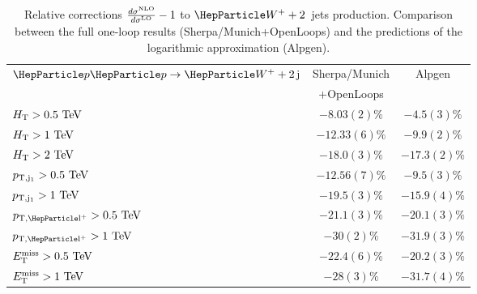 \documentclass[11pt]{cernrep}
\begin{document}
\begin{table}
\centering
\small{
\begin{tabular}{l|c|c}
\hline
$\Pp\Pp\to\PW^++2\,\rm j$ & {\sc Sherpa/Munich}  & {\sc Alpgen}  \\[-1ex]
                          & {\sc +OpenLoops}  &  \\
\hline
\hline
$H_{\rm T}>0.5~\text{TeV}$ & $-8.03(2)\%$  & $-4.5(3)\%$     \\
$H_{\rm T}>1~\text{TeV}$   & $-12.33(6)\%$ & $-9.9(2)\%$       \\
$H_{\rm T}>2~\text{TeV}$   & $-18.0(3)\%$ & $-17.3(2)\%$       \\
\hline
$p_{\rm T,j_1}>0.5~\text{TeV}$  & $-12.56(7)\%$ & $-9.5(3)\%$      \\
$p_{\rm T,j_1}>1~\text{TeV}$    & $-19.5(3)\%$  & $-15.9(4)\%$       \\
\hline
$p_{\rm T,\Pl^+}>0.5\UTeV$  & $-21.1(3)\%$   &  $-20.1(3)\%$   \\
$p_{\rm T,\Pl^+}>1\UTeV$    & $-30(2)\%$     &  $-31.9(3)\%$     \\
\hline
$E_{\rm T}^{\rm miss}>0.5~\text{TeV}$  & $-22.4(6)\%$  &  $-20.2(3)\%$    \\
$E_{\rm T}^{\rm miss}>1~\text{TeV}$    & $-28(3)\%$    &  $-31.7(4)\%$    \\
\hline
\end{tabular}
}
\caption{ \label{tabelwpj} Relative corrections $\frac{d \sigma^{\rm NLO}}{d \sigma^{\rm LO}}-1$ to 
$\PW^++2$~jets production. Comparison between the full one-loop results ({\sc Sherpa/Munich+OpenLoops}) and the 
predictions of the logarithmic approximation ({\sc Alpgen}).}
\end{table}
\end{document}

